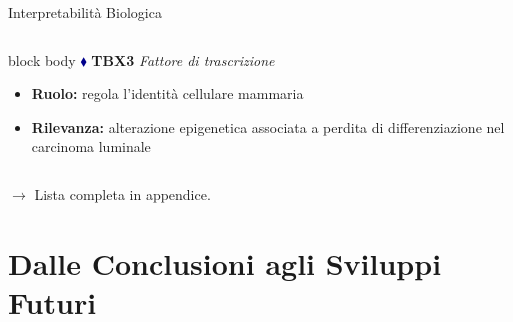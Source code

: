 \documentclass{beamer}
\begin{document}
\begin{frame}{Interpretabilità Biologica}
\begin{columns}[t, onlytextwidth]
\vspace{0.5em}
\begin{beamercolorbox}[rounded=true, sep=6pt]{block body}
{\large \textcolor{darkblue}{$\blacklozenge$}}\;
\textbf{TBX3} \hfill {\scriptsize \textit{Fattore di trascrizione}}\\[3pt]
{\scriptsize
\begin{itemize}
  \item \textbf{Ruolo:} regola l'identità cellulare mammaria
  \item \textbf{Rilevanza:} alterazione epigenetica associata a perdita di differenziazione nel carcinoma luminale
\end{itemize}
}
\end{beamercolorbox}


\end{columns}

\vspace{0.4em}
\hfill{\scriptsize $\rightarrow$ Lista completa in appendice.}

\end{frame}

\section{Dalle Conclusioni agli Sviluppi Futuri}
\end{document}
